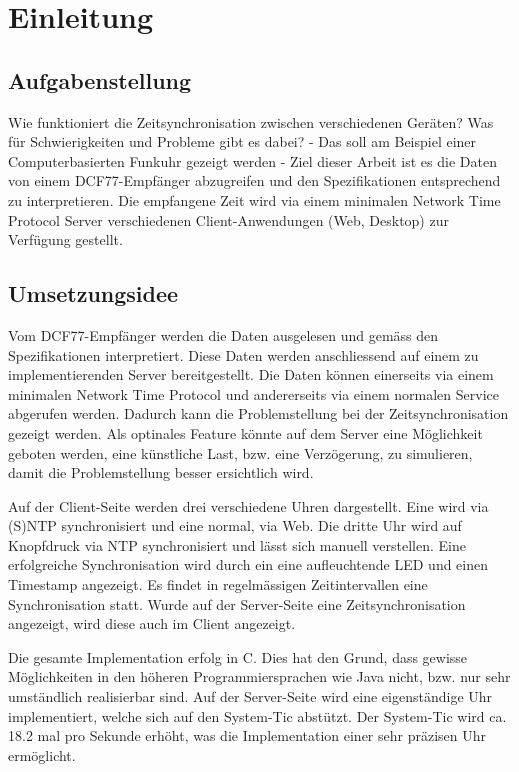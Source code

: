 
\chapter{Einleitung}



\section{Aufgabenstellung}

Wie funktioniert die Zeitsynchronisation zwischen verschiedenen Geräten? Was für Schwierigkeiten und Probleme gibt es dabei? - Das soll am Beispiel einer Computerbasierten Funkuhr gezeigt werden - Ziel dieser Arbeit ist es die Daten von einem DCF77-Empfänger abzugreifen und den Spezifikationen entsprechend zu interpretieren. Die empfangene Zeit wird via einem minimalen Network Time Protocol Server verschiedenen Client-Anwendungen (Web, Desktop) zur Verfügung gestellt.

\section{Umsetzungsidee}

Vom DCF77-Empfänger werden die Daten ausgelesen und gemäss den Spezifikationen interpretiert. Diese Daten werden anschliessend auf einem zu implementierenden Server bereitgestellt. Die Daten können einerseits via einem minimalen Network Time Protocol und andererseits via einem normalen Service abgerufen werden. Dadurch kann die Problemstellung bei der Zeitsynchronisation gezeigt werden. Als optinales Feature könnte auf dem Server eine Möglichkeit geboten werden, eine künstliche Last, bzw. eine Verzögerung, zu simulieren, damit die Problemstellung besser ersichtlich wird.

Auf der Client-Seite werden drei verschiedene Uhren dargestellt. Eine wird via (S)NTP synchronisiert und eine normal, via Web. Die dritte Uhr wird auf Knopfdruck via NTP synchronisiert und lässt sich manuell verstellen. Eine erfolgreiche Synchronisation wird durch ein eine aufleuchtende LED und einen Timestamp angezeigt. Es findet in regelmässigen Zeitintervallen eine Synchronisation statt. Wurde auf der Server-Seite eine Zeitsynchronisation angezeigt, wird diese auch im Client angezeigt.

Die gesamte Implementation erfolg in C. Dies hat den Grund, dass gewisse Möglichkeiten in den höheren Programmiersprachen wie Java nicht, bzw. nur sehr umständlich realisierbar sind. Auf der Server-Seite wird eine eigenständige Uhr implementiert, welche sich auf den System-Tic abstützt. Der System-Tic wird ca. 18.2 mal pro Sekunde erhöht, was die Implementation einer sehr präzisen Uhr ermöglicht. 
